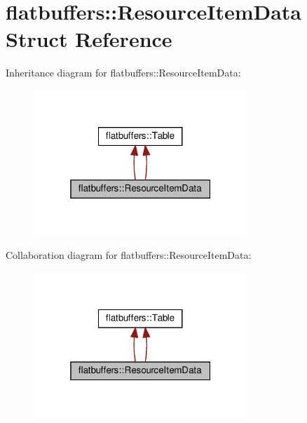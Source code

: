 \hypertarget{structflatbuffers_1_1ResourceItemData}{}\section{flatbuffers\+:\+:Resource\+Item\+Data Struct Reference}
\label{structflatbuffers_1_1ResourceItemData}


Inheritance diagram for flatbuffers\+:\+:Resource\+Item\+Data\+:
\nopagebreak
\begin{figure}[H]
\begin{center}
\leavevmode
\includegraphics[width=229pt]{structflatbuffers_1_1ResourceItemData__inherit__graph}
\end{center}
\end{figure}


Collaboration diagram for flatbuffers\+:\+:Resource\+Item\+Data\+:
\nopagebreak
\begin{figure}[H]
\begin{center}
\leavevmode
\includegraphics[width=229pt]{structflatbuffers_1_1ResourceItemData__coll__graph}
\end{center}
\end{figure}
